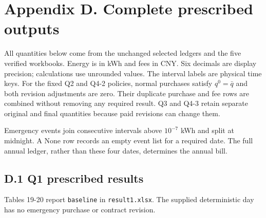 \section*{Appendix D. Complete prescribed outputs}\label{appendix-d.-complete-prescribed-outputs}

All quantities below come from the unchanged selected ledgers and the five verified workbooks. Energy is in kWh and fees in CNY. Six decimals are display precision; calculations use unrounded values. The interval labels are physical time keys. For the fixed Q2 and Q4-2 policies, normal purchases satisfy \(q^0=\bar q\) and both revision adjustments are zero. Their duplicate purchase and fee rows are combined without removing any required result. Q3 and Q4-3 retain separate original and final quantities because paid revisions can change them.

Emergency events join consecutive intervals above \(10^{-7}\) kWh and split at midnight. A None row records an empty event list for a required date. The full annual ledger, rather than these four dates, determines the annual bill.

\subsection*{D.1 Q1 prescribed results}\label{d.1-q1-prescribed-results}

Tables 19-20 report \nolinkurl{baseline} in \nolinkurl{result1.xlsx}. The supplied deterministic day has no emergency purchase or contract revision.

\Needspace{85.0pt}
\begingroup
\fontsize{9.0}{10.8}\selectfont
\setlength{\tabcolsep}{3.2pt}
\renewcommand{\arraystretch}{1.12}
\setlength{\LTleft}{0pt plus 1fill}\setlength{\LTright}{0pt plus 1fill}
\setlength{\LTcapwidth}{\linewidth}

